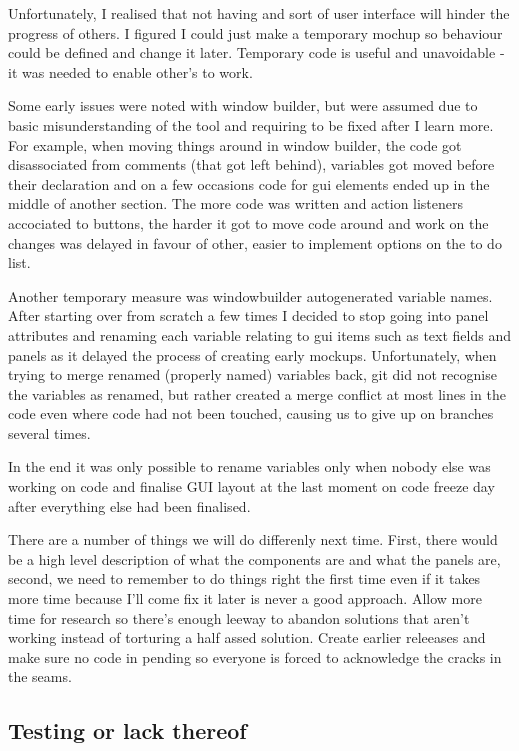 \documentclass{l3proj}
\begin{document}
Unfortunately, I realised that not having and sort of user interface will hinder the progress of others. I figured I could just make a temporary mochup so behaviour could be defined and change it later. Temporary code is useful and unavoidable \cite{halpern} - it was needed to enable other's to work. 

Some early issues were noted with window builder, but were assumed due to basic misunderstanding of the tool and requiring to be fixed after I learn more. For example, when moving things around in window builder, the code got disassociated from comments (that got left behind), variables got moved before their declaration and on a few occasions code for gui elements ended up in the middle of another section. The more code was written and action listeners accociated to buttons, the harder it got to move code around and work on the changes was delayed in favour of other, easier to implement options on the to do list.

 Another temporary measure was windowbuilder autogenerated variable names. After starting over from scratch a few times I decided to stop going into panel attributes and renaming each variable relating to gui items such as text fields and panels as it delayed the process of creating early mockups. Unfortunately, when trying to merge renamed (properly named) variables back, git did not recognise the variables as renamed, but rather created a merge conflict at most lines in the code even where code had not been touched, causing us to give up on branches several times. 

In the end it was only possible to rename variables only when nobody else was working on code and finalise GUI layout at the last moment on code freeze day after everything else had been finalised. 

There are a number of things we will do differenly next time. First, there would be a high level description of what the components are and what the panels are, second, we need to remember to do things right the first time even if it takes more time because I'll come fix it later is never a good approach. Allow more time for research so there's enough leeway to abandon solutions that aren't working instead of torturing a half assed solution. Create earlier releeases and make sure no code in pending so everyone is forced to acknowledge the cracks in the seams. 

\subsection{Testing or lack thereof}
\end{document}
